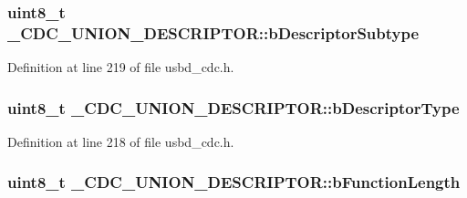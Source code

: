\subsubsection[{\texorpdfstring{b\+Descriptor\+Subtype}{bDescriptorSubtype}}]{\setlength{\rightskip}{0pt plus 5cm}uint8\+\_\+t \+\_\+\+C\+D\+C\+\_\+\+U\+N\+I\+O\+N\+\_\+\+D\+E\+S\+C\+R\+I\+P\+T\+O\+R\+::b\+Descriptor\+Subtype}\hypertarget{struct__CDC__UNION__DESCRIPTOR_a5d9d4e51f6313dd40d479cbd688b8c8d}{}\label{struct__CDC__UNION__DESCRIPTOR_a5d9d4e51f6313dd40d479cbd688b8c8d}


Definition at line 219 of file usbd\+\_\+cdc.\+h.

\subsubsection[{\texorpdfstring{b\+Descriptor\+Type}{bDescriptorType}}]{\setlength{\rightskip}{0pt plus 5cm}uint8\+\_\+t \+\_\+\+C\+D\+C\+\_\+\+U\+N\+I\+O\+N\+\_\+\+D\+E\+S\+C\+R\+I\+P\+T\+O\+R\+::b\+Descriptor\+Type}\hypertarget{struct__CDC__UNION__DESCRIPTOR_a605016c2bd378f5dd95533edf130b4c9}{}\label{struct__CDC__UNION__DESCRIPTOR_a605016c2bd378f5dd95533edf130b4c9}


Definition at line 218 of file usbd\+\_\+cdc.\+h.

\subsubsection[{\texorpdfstring{b\+Function\+Length}{bFunctionLength}}]{\setlength{\rightskip}{0pt plus 5cm}uint8\+\_\+t \+\_\+\+C\+D\+C\+\_\+\+U\+N\+I\+O\+N\+\_\+\+D\+E\+S\+C\+R\+I\+P\+T\+O\+R\+::b\+Function\+Length}\hypertarget{struct__CDC__UNION__DESCRIPTOR_a1dfd18183a0989b8631c11b718ce3819}{}\label{struct__CDC__UNION__DESCRIPTOR_a1dfd18183a0989b8631c11b718ce3819}


